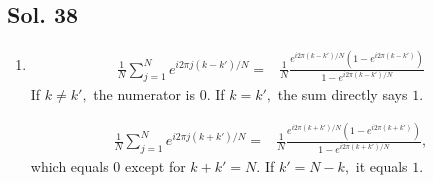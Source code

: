    \subsection*{Sol. 38}
   \begin{enumerate}
       \item 
       \begin{align*}
           \frac{1}{N}
           \sum_{j=1}^N
           e^{i2\pi j(k-k')/N}
           = & 
           \frac{1}{N}
           \frac{e^{i2\pi(k-k')/N}(1-e^{i2\pi(k-k')})}{1-e^{i2\pi(k-k')/N}}
       \end{align*}
       If $k\neq k',$ the numerator is $0.$ If $k=k',$
       the sum directly says $1.$
    
        \begin{align*}
           \frac{1}{N}
           \sum_{j=1}^N
           e^{i2\pi j(k+k')/N}
           = & 
           \frac{1}{N}
           \frac{e^{i2\pi(k+k')/N}(1-e^{i2\pi(k+k')})}{1-e^{i2\pi(k+k')/N}},
       \end{align*}
       which equals $0$ except for $k+k'=N.$ If $k'=N-k,$ it equals $1.$


\end{enumerate}
